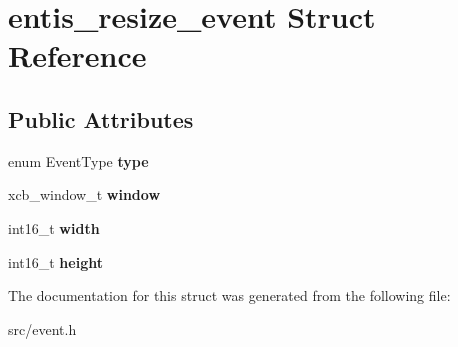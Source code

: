 \hypertarget{structentis__resize__event}{}\section{entis\+\_\+resize\+\_\+event Struct Reference}
\label{structentis__resize__event}
\subsection*{Public Attributes}
\begin{DoxyCompactItemize}
\item 
\mbox{\label{structentis__resize__event_ad76e5ea08e83e2b03d0fde227737206f}} 
enum Event\+Type {\bfseries type}
\item 
\mbox{\label{structentis__resize__event_ab6b4a3e8b3480dc49377515d4d749de6}} 
xcb\+\_\+window\+\_\+t {\bfseries window}
\item 
\mbox{\label{structentis__resize__event_a29360543a9a24b2c4910116d5c4ec197}} 
int16\+\_\+t {\bfseries width}
\item 
\mbox{\label{structentis__resize__event_a9650e9c98e7b1ee90a93c3039d055de2}} 
int16\+\_\+t {\bfseries height}
\end{DoxyCompactItemize}


The documentation for this struct was generated from the following file\+:\begin{DoxyCompactItemize}
\item 
src/event.\+h\end{DoxyCompactItemize}
